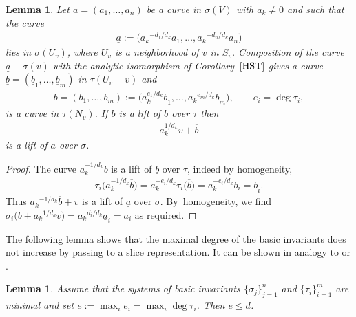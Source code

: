 \documentclass[pdftex]{sigma}
\numberwithin{equation}{section}
\newtheorem{Lemma}[Theorem]{Lemma}
\def\si{\sigma}
\def\ta{\tau}
\begin{document}
\begin{Lemma} \label{lem:red}
 Let $a=(a_1,\dots,a_n)$ be a curve in $\si(V)$ with $a_k \ne 0$ and such that the curve
 \begin{gather*}
 \underline a := \big({a_k}^{-d_1/d_k} a_1,\dots,{a_k}^{-d_n/d_k} a_n\big)
 \end{gather*}
 lies in $\si(U_v)$, where $U_v$ is a neighborhood of $v$ in $S_v$.
 Composition of the curve $\underline a -\si(v)$ with the analytic isomorphism of Corollary~$\ref{HST}$ gives a
 curve $\underline b = (\underline b_1,\dots,\underline b_m)$ in $\ta(U_v-v)$ and
 \begin{gather*}
 b = (b_1,\dots,b_m)
 := \big(a_k^{e_1/d_k} \underline b_1,\dots,{a_k}^{e_m/d_k} \underline b_m\big),
 \qquad e_i = \deg \ta_i,
 \end{gather*}
 is a curve in $\ta(N_v)$. If $\overline b$ is a lift of $b$ over $\ta$ then
 \begin{gather*} %
 a_k^{1/d_k} v + \overline b
 \end{gather*}
 is a lift of $a$ over $\si$.
\end{Lemma}

\begin{proof}
 The curve $a_k^{-1/d_k} \overline b$ is a lift of $\underline b$ over $\ta$, indeed by homogeneity,
 \begin{gather*}
 \ta_i\big(a_k^{-1/d_k} \overline b\big) = a_k^{-e_i/d_k} \ta_i\big(\overline b\big)
 = a_k^{-e_i/d_k} b_i = \underline b_i.
 \end{gather*}
 Thus ${a_k}^{-1/d_k} \overline b + v$ is a lift of $\underline a$ over $\si$. By~homogeneity, we find $\si_i\big(\overline b + {a_k}^{1/d_k} v\big) = {a_k}^{d_i/d_k} \underline a_i = a_i$
 as required.
\end{proof}


The following lemma shows that the maximal degree of the basic invariants does not increase by
passing to a slice representation. It can be shown in analogy to \cite[Lemma 2.4]{KLMR06} or \cite{ParusinskiRainer14}.

\begin{Lemma} \label{lem:e}
 Assume that the systems of basic invariants $\{\si_j\}_{j=1}^n$ and $\{\ta_i\}_{i=1}^m$ are minimal and
 set $e := \max_{i} e_i = \max_{i} \deg \ta_i$. Then $e \le d$.
\end{Lemma}
\end{document}
